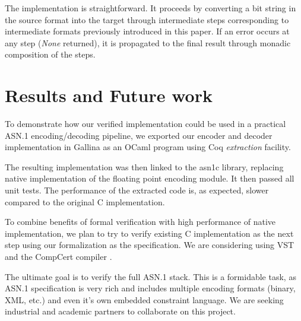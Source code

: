 \documentclass[sigplan]{acmart}
\begin{document}
The implementation is straightforward. It proceeds by converting a bit string in the
source format into the target through intermediate steps corresponding to
intermediate formats previously introduced in this paper. If an error occurs at any step
(\emph{None} returned), it is propagated to the final result through monadic composition of the steps.

\section{Results and Future work}

To demonstrate how our verified implementation could be used in a practical ASN.1 encoding/decoding
pipeline, we exported our encoder and decoder implementation in Gallina as an OCaml program using
Coq \textit{extraction} \cite{letouzey2008extraction} facility. 

The resulting implementation was then linked to the asn1c library, replacing native implementation of the
floating point encoding module. It then passed all unit tests. The performance of
the extracted code is, as expected, slower compared to the original C implementation.

To combine benefits of formal verification with high performance of native
implementation, we plan  to try to verify existing C implementation as the next step
using our formalization as the specification. We are considering using
VST \cite{appel2011verified} and the CompCert compiler \cite {leroy2012compcert}. 

The ultimate goal is to verify the full ASN.1 stack. This is a formidable task, as
ASN.1 specification is very rich and includes multiple encoding formats
(binary, XML, etc.) and even it's own embedded constraint language. We are
seeking industrial and academic partners to collaborate on this project.

\nocite{*}

\end{document}
